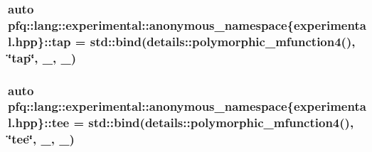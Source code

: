 \hypertarget{namespacepfq_1_1lang_1_1experimental_1_1anonymous__namespace_02experimental_8hpp_03_a66641cfa5d43270458e7fbfb626d0e2e}{
\subsubsection[{tap}]{\setlength{\rightskip}{0pt plus 5cm}auto pfq\+::lang\+::experimental\+::anonymous\+\_\+namespace\{experimental.\+hpp\}\+::tap = std\+::bind(details\+::polymorphic\+\_\+mfunction4(), \char`\"{}tap\char`\"{}, \+\_, \+\_)}}\label{namespacepfq_1_1lang_1_1experimental_1_1anonymous__namespace_02experimental_8hpp_03_a66641cfa5d43270458e7fbfb626d0e2e}
\hypertarget{namespacepfq_1_1lang_1_1experimental_1_1anonymous__namespace_02experimental_8hpp_03_a1c49a70b83c2e42067c558a8bfcf8211}{
\subsubsection[{tee}]{\setlength{\rightskip}{0pt plus 5cm}auto pfq\+::lang\+::experimental\+::anonymous\+\_\+namespace\{experimental.\+hpp\}\+::tee = std\+::bind(details\+::polymorphic\+\_\+mfunction4(), \char`\"{}tee\char`\"{}, \+\_, \+\_)}}\label{namespacepfq_1_1lang_1_1experimental_1_1anonymous__namespace_02experimental_8hpp_03_a1c49a70b83c2e42067c558a8bfcf8211}

